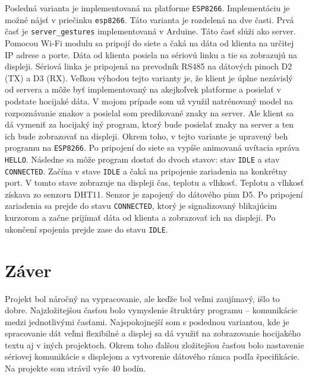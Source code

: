 \documentclass[a4paper, 12pt]{article}
\begin{document}
Posledná varianta je implementovaná na platforme \texttt{ESP8266}. Implementáciu je možné nájsť v priečinku \texttt{esp8266}. Táto varianta je rozdelená na dve časti. Prvá časť je \texttt{server\_gestures} implementovaná v Arduine. Táto časť slúži ako server. Pomocou Wi-Fi modulu sa pripojí do siete a čaká na dáta od klienta na určitej IP adrese a porte. Dáta od klienta posiela na sériovú linku a tie sa zobrazujú na displeji. Sériová linka je pripojená na prevodník RS485 na dátových pinoch D2 (TX) a D3 (RX). Veľkou výhodou tejto varianty je, že klient je úplne nezávislý od servera a môže byť implementovaný na akejkoľvek platforme a posielať v podstate hocijaké dáta. V mojom prípade som už využil natrénovaný model na rozpoznávanie znakov a posielal som predikované znaky na server. Ale klient sa dá vymeniť za hocijaký iný program, ktorý bude posielať znaky na server a ten ich bude zobrazovať na displeji. Okrem toho, v tejto variante je upravený beh programu na \texttt{ESP8266}. Po pripojení do siete sa vypíše animovaná uvítacia správa \texttt{HELLO}. Následne sa môže program dostať do dvoch stavov: stav \texttt{IDLE} a stav \texttt{CONNECTED}. Začína v stave \texttt{IDLE} a čaká na pripojenie zariadenia na konkrétny port. V tomto stave zobrazuje na displeji čas, teplotu a vlhkosť. Teplotu a vlhkosť získava zo senzoru DHT11. Senzor je zapojený do dátového pinu D5. Po pripojení zariadenia sa prejde do stavu \texttt{CONNECTED}, ktorý je signalizovaný blikajúcim kurzorom a začne prijímať dáta od klienta a zobrazovať ich na displeji. Po ukončení spojenia prejde zase do stavu \texttt{IDLE}.

\section{Záver}

Projekt bol náročný na vypracovanie, ale keďže bol veľmi zaujímavý, išlo to dobre. Najzložitejšou časťou bolo vymyslenie štruktúry programu – komunikácie medzi jednotlivými časťami. Najspokojnejší som s poslednou variantou, kde je spracovanie dát veľmi flexibilné a displej sa dá využiť na zobrazovanie hocijakého textu aj v iných projektoch. Okrem toho ďalšou zložitejšou časťou bolo nastavenie sériovej komunikácie s displejom a vytvorenie dátového rámca podľa špecifikácie. Na projekte som strávil vyše 40 hodín.
\end{document}
